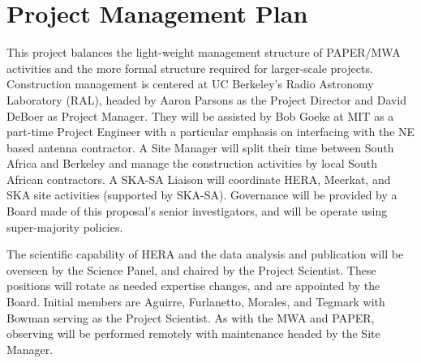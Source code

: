\documentclass[preprint]{aastex}
\begin{document}
%
%
%
%
%
%
%

\vspace{-0.25in}
\section{Project Management Plan}
\label{PMPsec}

This project balances the light-weight management structure of PAPER/MWA
activities and the more formal structure required for larger-scale projects.
Construction management is centered at UC Berkeley's Radio Astronomy Laboratory
(RAL), headed by Aaron Parsons as the Project Director and David DeBoer as
Project Manager. They will be assisted by Bob Goeke at MIT as a part-time
Project Engineer with a particular emphasis on interfacing with the NE based
antenna contractor.  A Site Manager will split their time between South Africa
and Berkeley and manage the construction activities by local South African
contractors. A SKA-SA Liaison will coordinate HERA, Meerkat, and SKA site
activities (supported by SKA-SA). Governance will be provided by a Board made
of this proposal's senior investigators, and will be operate using
super-majority policies. 

The scientific capability of HERA and the data analysis and publication will be
overseen by the Science Panel, and chaired by the Project Scientist. These
positions will rotate as needed expertise changes, and are appointed by the
Board. Initial members are Aguirre, Furlanetto, Morales, and Tegmark with
Bowman serving as the Project Scientist. As with the MWA and PAPER, observing
will be performed remotely with maintenance headed by the Site Manager.
\end{document}
